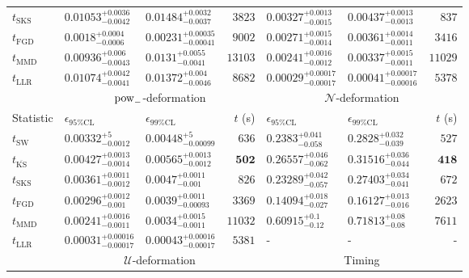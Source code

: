\begin{tabular}{l|llr|llr}
	$t_{\mathrm{SKS}}$ & $0.01053_{-0.0042}^{+0.0036}$ & $0.01484_{-0.0037}^{+0.0032}$ & $3823$ & $0.00327_{-0.0015}^{+0.0013}$ & $0.00437_{-0.0013}^{+0.0013}$ & $837$ \\
	$t_{\mathrm{FGD}}$ & ${\mathbf{0.0018_{-0.0006}^{+0.0004}}}$ & ${\mathbf{0.00231_{-0.00041}^{+0.00035}}}$ & $9002$ & $0.00271_{-0.0014}^{+0.0015}$ & $0.00361_{-0.0011}^{+0.0014}$ & $3416$ \\
	$t_{\mathrm{MMD}}$ & $0.00936_{-0.0043}^{+0.006}$ & $0.0131_{-0.0041}^{+0.0055}$ & $13103$ & ${\mathbf{0.00241_{-0.0012}^{+0.0016}}}$ & ${\mathbf{0.00337_{-0.0011}^{+0.0015}}}$ & $11029$ \\
	$t_{\mathrm{LLR}}$ & $0.01074_{-0.0041}^{+0.0042}$ & $0.01372_{-0.0046}^{+0.004}$ & $8682$ & $0.00029_{-0.00017}^{+0.00017}$ & $0.00041_{-0.00016}^{+0.00017}$ & $5378$ \\
	\toprule
	\multicolumn{1}{c}{} & \multicolumn{3}{c}{$\rm{pow}_{-}$-deformation} & \multicolumn{3}{c}{$\mathcal{N}$-deformation} \\
	Statistic & $\epsilon_{95\%\mathrm{CL}}$ & $\epsilon_{99\%\mathrm{CL}}$ & $t$ (s) & $\epsilon_{95\%\mathrm{CL}}$ & $\epsilon_{99\%\mathrm{CL}}$ & $t$ (s) \\
	\midrule
	$t_{\mathrm{SW}}$ & $0.00332_{-0.0012}^{+5}$ & $0.00448_{-0.00099}^{+5}$ & $636$ & $0.2383_{-0.058}^{+0.041}$ & $0.2828_{-0.039}^{+0.032}$ & $527$ \\
	$t_{\overline{\mathrm{KS}}}$ & $0.00427_{-0.0014}^{+0.0013}$ & $0.00565_{-0.0012}^{+0.0013}$ & ${\mathbf{502}}$ & $0.26557_{-0.062}^{+0.046}$ & $0.31516_{-0.044}^{+0.036}$ & ${\mathbf{418}}$ \\
	$t_{\mathrm{SKS}}$ & $0.00361_{-0.0012}^{+0.0011}$ & $0.0047_{-0.001}^{+0.0011}$ & $826$ & $0.23289_{-0.057}^{+0.042}$ & $0.27403_{-0.041}^{+0.034}$ & $672$ \\
	$t_{\mathrm{FGD}}$ & $0.00296_{-0.001}^{+0.0012}$ & $0.0039_{-0.00093}^{+0.0011}$ & $3369$ & ${\mathbf{0.14094_{-0.027}^{+0.018}}}$ & ${\mathbf{0.16127_{-0.016}^{+0.013}}}$ & $2623$ \\
	$t_{\mathrm{MMD}}$ & ${\mathbf{0.00241_{-0.0011}^{+0.0016}}}$ & ${\mathbf{0.0034_{-0.0011}^{+0.0015}}}$ & $11032$ & $0.60915_{-0.12}^{+0.1}$ & $0.71813_{-0.08}^{+0.08}$ & $7611$ \\
	$t_{\mathrm{LLR}}$ & $0.00031_{-0.00017}^{+0.00016}$ & $0.00043_{-0.00017}^{+0.00016}$ & $5381$ & - & - & - \\
	\toprule
	\multicolumn{1}{c}{} & \multicolumn{3}{c}{$\mathcal{U}$-deformation} & \multicolumn{3}{c}{Timing} \\

\end{tabular}
